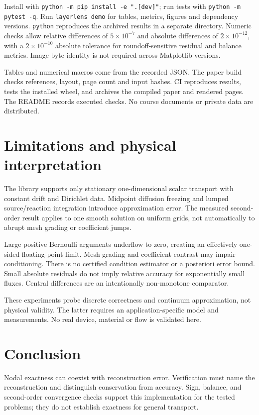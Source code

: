 \documentclass[11pt,a4paper]{article}
\begin{document}
Install with \texttt{python -m pip install -e ".[dev]"}; run tests with
\texttt{python -m pytest -q}. Run \texttt{layerlens demo} for tables, metrics,
figures and dependency versions. \texttt{python} 
reproduces the archived results in a separate directory.
Numeric checks allow relative differences of $5\times10^{-7}$
and absolute differences of $2\times10^{-12}$, with a $2\times10^{-10}$ absolute
tolerance for roundoff-sensitive residual and balance metrics. Image byte
identity is not required across Matplotlib versions.

Tables and numerical macros come from the recorded JSON. The paper build checks
references, layout, page count and input hashes. CI reproduces results, tests the
installed wheel, and archives the compiled paper and rendered pages.
The README records executed checks. No course documents or private data are
distributed.

\section{Limitations and physical interpretation}
The library supports only stationary one-dimensional scalar transport with
constant drift and Dirichlet data. Midpoint diffusion freezing and lumped
source/reaction integration introduce approximation error. The measured
second-order result applies to one smooth solution on uniform grids, not
automatically to abrupt mesh grading or coefficient jumps.

Large positive Bernoulli arguments underflow to zero, creating an effectively
one-sided floating-point limit. Mesh grading and coefficient contrast may impair
conditioning. There is no certified condition estimator or a posteriori error
bound. Small absolute residuals do not imply relative accuracy for exponentially
small fluxes. Central differences are an intentionally non-monotone comparator.

These experiments probe discrete correctness and continuum approximation, not
physical validity. The latter requires an application-specific model and
measurements. No real device, material or flow is validated here.

\section{Conclusion}
Nodal exactness can coexist with reconstruction error. Verification must name
the reconstruction and distinguish conservation from accuracy. Sign, balance,
and second-order convergence checks support this implementation for the tested
problems; they do not establish exactness for general transport.
\end{document}
